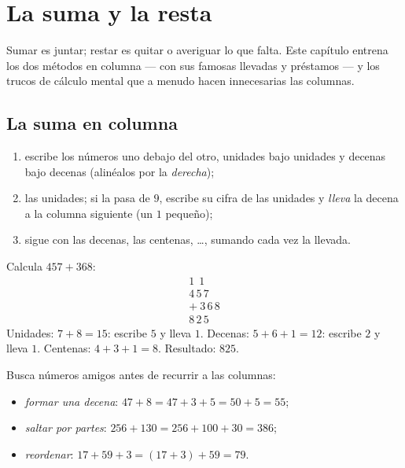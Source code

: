 \chapter{La suma y la resta}\label{ch:g3:addsub}

Sumar es juntar; restar es quitar o
averiguar lo que falta. Este capítulo entrena los dos métodos en columna
--- con sus famosas llevadas y préstamos --- y los trucos de cálculo mental
que a menudo hacen innecesarias las columnas.

\section{La suma en columna}

\begin{method}\label{met:g3:addsub:add}
\begin{enumerate}
  \item escribe los números uno debajo del otro, unidades bajo unidades y
        decenas bajo decenas (alinéalos por la \emph{derecha});
  \item {} las unidades; si la  pasa de $9$, escribe su cifra de las unidades
        y \emph{lleva} la decena a la columna siguiente (un $1$ pequeño);
  \item sigue con las decenas, las centenas, \dots, sumando cada vez la
        llevada.
\end{enumerate}
\end{method}

\begin{example}\label{ex:g3:addsub:add}
Calcula $457 + 368$:
\[
\begin{array}{r}
{\scriptstyle 1}\ \ {\scriptstyle 1}\ \ \phantom{0} \\[-3pt]
4\,5\,7 \\
+\ 3\,6\,8 \\
\hline
8\,2\,5
\end{array}
\]
Unidades: $7 + 8 = 15$: escribe $5$ y lleva $1$. Decenas:
$5 + 6 + 1 = 12$: escribe $2$ y lleva $1$. Centenas: $4 + 3 + 1 = 8$.
Resultado: $825$.
\end{example}

\begin{example}\label{ex:g3:addsub:mental}
Busca números amigos antes de recurrir a las columnas:
\begin{itemize}
  \item \emph{formar una decena}: $47 + 8 = 47 + 3 + 5 = 50 + 5 = 55$;
  \item \emph{saltar por partes}: $256 + 130 = 256 + 100 + 30 = 386$;
  \item \emph{reordenar}: $17 + 59 + 3 = (17 + 3) + 59 = 79$.
\end{itemize}
\end{example}

